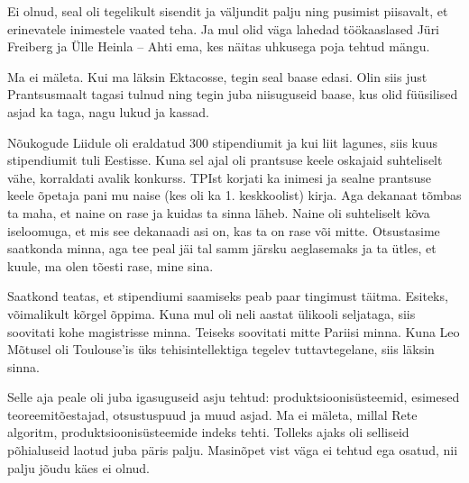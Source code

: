 Ei olnud, seal oli tegelikult sisendit ja väljundit palju ning pusimist piisavalt, et erinevatele 
inimestele vaated teha. Ja mul olid väga lahedad 
töökaaslased Jüri Freiberg ja Ülle 
Heinla – Ahti ema, kes näitas uhkusega poja
tehtud mängu. 


Ma ei mäleta. Kui ma läksin Ektacosse, tegin seal 
baase edasi. Olin siis just Prantsusmaalt tagasi tulnud ning tegin juba 
niisuguseid baase, kus olid füüsilised asjad ka taga, nagu lukud ja kassad.


Nõukogude Liidule oli eraldatud 300 stipendiumit ja kui liit 
lagunes, 
siis kuus stipendiumit tuli Eestisse. Kuna sel ajal oli prantsuse keele 
oskajaid suhteliselt vähe, korraldati 
avalik konkurss. TPIst korjati ka inimesi ja sealne prantsuse keele õpetaja 
pani mu naise (kes oli ka 1. keskkoolist) kirja. Aga dekanaat tõmbas ta 
maha, et naine on rase ja kuidas ta sinna läheb. Naine oli suhteliselt kõva 
iseloomuga, et mis see dekanaadi asi on, kas ta on rase või mitte. Otsustasime
saatkonda minna, aga tee peal jäi tal samm järsku 
aeglasemaks ja ta ütles, et kuule, ma olen tõesti rase, mine sina.

Saatkond teatas, et stipendiumi saamiseks 
peab paar tingimust täitma. Esiteks, võimalikult kõrgel õppima. Kuna mul oli 
neli aastat ülikooli seljataga, siis soovitati kohe magistrisse minna. Teiseks soovitati mitte 
Pariisi minna. Kuna Leo Mõtusel oli Toulouse'is 
üks tehisintellektiga tegelev tuttavtegelane, siis läksin 
sinna.


Selle aja peale oli juba igasuguseid asju tehtud: 
produktsioonisüsteemid, esimesed teoreemitõestajad, otsustuspuud ja muud asjad. Ma ei mäleta, millal 
Rete algoritm,
produktsioonisüsteemide indeks tehti. Tolleks ajaks oli 
selliseid põhialuseid laotud juba päris palju. Masinõpet vist väga 
ei tehtud ega osatud, nii palju jõudu käes ei olnud.

